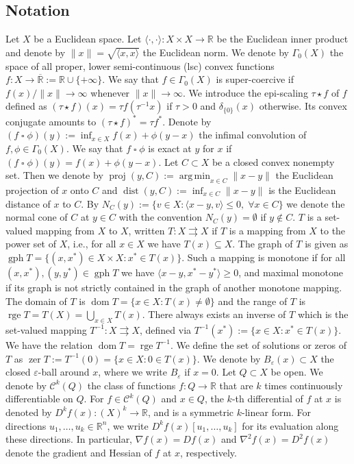 \documentclass[11pt,onecolumn]{article}
\DeclareMathOperator*{\argmin}{arg\,min}
\DeclareMathOperator{\gph}{gph}
\DeclareMathOperator{\dom}{dom}
\DeclareMathOperator{\ran}{rge}
\DeclareMathOperator{\proj}{proj}
\DeclareMathOperator{\zer}{zer}
\DeclareMathOperator{\dist}{dist}
\newcommand{\bR}{\mathbb{R}}
\newcommand{\exR}{\overline{\mathbb{R}}}
\theoremstyle{remark}
\begin{document}
\subsection{Notation}
Let $X$ be a Euclidean space. Let $\langle \cdot,\cdot \rangle : X \times X \to \bR$ be the Euclidean inner product and denote by $\|x\|=\sqrt{\langle x,x \rangle}$ the Euclidean norm. We denote by $\Gamma_0(X)$ the space of all proper, lower semi-continuous (lsc) convex functions $f:X \to \exR := \bR \cup \{+\infty\}$.
We say that $f\in \Gamma_0(X)$ is super-coercive if $f(x)/\|x\|\to \infty$ whenever $\|x\|\to\infty$. 
We introduce the epi-scaling $\tau \star f$ of $f$ defined as $(\tau \star f)(x) =
        \tau f(\tau^{-1} x)$ if $\tau > 0$ and $\delta_{\{0\}}(x)$ otherwise. Its convex conjugate amounts to $(\tau \star f)^* = \tau f^*.$ Denote by $(f \mathbin{\square} \phi)(y):=\inf_{x\in X} f(x) + \phi(y-x)$ the infimal convolution of $f,\phi \in \Gamma_0(X)$. We say that $f \mathbin{\square} \phi$ is exact at $y$ for $x$ if $(f \mathbin{\square} \phi)(y)=f(x)+\phi(y-x)$. Let $C \subset X$ be a closed convex nonempty set. Then we denote by $\proj(y, C):=\argmin_{x \in C}\|x-y\|$ the Euclidean projection of $x$ onto $C$ and $\dist(y, C):=\inf_{x \in C}\|x-y\|$ is the Euclidean distance of $x$ to $C$. By $N_C(y):=\{v \in X : \langle x-y,v \rangle \leq 0,\;  \forall x \in C\}$ we denote the normal cone of $C$ at $y \in C$ with the convention $N_C(y)=\emptyset$ if $y \notin C$. $T$ is a set-valued mapping from $X$ to $X$, written $T: X \rightrightarrows X$ if $T$ is a mapping from $X$ to the power set of $X$, i.e., for all $x \in X$ we have $T(x) \subseteq X$. The graph of $T$ is given as $\gph T = \{ (x,x^*) \in X \times X : x^* \in T(x)\}$. Such a mapping is monotone if for all $(x,x^*),(y,y^*) \in \gph T$ we have $\langle x-y, x^* - y^*\rangle \geq 0$, and maximal monotone if its graph is not strictly contained in the graph of another monotone mapping. The domain of $T$ is $\dom T= \{x \in X : T(x) \neq \emptyset \}$ and the range of $T$ is $\ran T= T(X) = \bigcup_{x \in X} T(x)$. There always exists an inverse of $T$ which is the set-valued mapping $T^{-1}: X \rightrightarrows X$, defined via $T^{-1}(x^*):=\{x \in X : x^*\in T(x)\}$. We have the relation $\dom T = \ran T^{-1}$. We define the set of solutions or zeros of $T$ as $\zer T := T^{-1}(0)= \{ x \in X : 0 \in T(x)\}$. We denote by $B_\varepsilon(x)\subset X$ the closed $\varepsilon$-ball around $x$, where we write $B_\varepsilon$ if $x=0$.
Let $Q\subset X$ be open. We denote by $\mathcal{C}^k(Q)$ the class of functions $f:Q\to\bR$ that are $k$ times continuously differentiable on $Q$.
For $f\in \mathcal{C}^k(Q)$ and $x\in Q$, the $k$-th differential of $f$ at $x$ is denoted by
$D^k f(x):(X)^k\to \bR$,
and is a symmetric $k$-linear form.
For directions $u_1,\ldots,u_k\in\bR^n$, we write $D^k f(x)[u_1,\ldots,u_k]$ for its evaluation along these directions.
In particular, $\nabla f(x)=D f(x)$ and $\nabla^2 f(x)=D^2 f(x)$ denote the gradient and Hessian of $f$ at $x$, respectively.
\end{document}
